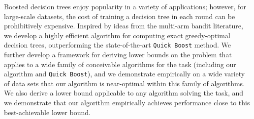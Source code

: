
Boosted decision trees enjoy popularity in a variety of applications;
however, for large-scale datasets, the cost of training a decision
tree in each round can be prohibitively expensive.  Inspired by ideas
from the multi-arm bandit literature, we develop a highly efficient
algorithm for computing exact greedy-optimal decision trees,
outperforming the state-of-the-art \texttt{Quick Boost} method.  We
further develop a framework for deriving lower bounds on the problem
that applies to a wide family of conceivable algorithms for the task
(including our algorithm and \texttt{Quick Boost}), and we demonstrate
empirically on a wide variety of data sets that our algorithm is
near-optimal within this family of algorithms.  We also
derive a lower bound applicable to any algorithm solving the task, and
we demonstrate that our algorithm empirically achieves performance
close to this best-achievable lower bound.

